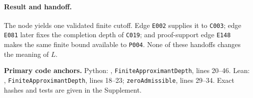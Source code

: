 \paragraph*{Result and handoff.}
The node yields one validated finite cutoff.  Edge \texttt{E002} supplies it to
\texttt{C003}; edge \texttt{E081} later fixes the completion depth of
\texttt{C019}; and proof-support edge \texttt{E148} makes the same finite bound
available to \texttt{P004}.  None of these handoffs changes the meaning of
$L$.

\noindent\textbf{Primary code anchors.}
Python: ,
\texttt{FiniteApproximantDepth}, lines 20--46.  Lean:
,
\texttt{FiniteApproximantDepth}, lines 18--23; \texttt{zeroAdmissible}, lines
29--34.  Exact hashes and tests are given in the Supplement.

